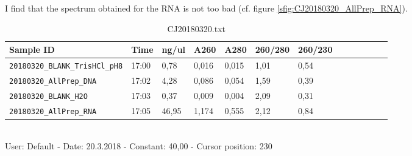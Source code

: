 I find that the spectrum obtained for the RNA is not too bad (cf. figure \ref{sfig:CJ20180320_AllPrep_RNA}).

\begin{table}[H]
\caption{CJ20180320.txt}
\label{tab:}
\centering
\begin{tabular}{l l l l l l l l l l l l l }
\toprule
Sample ID & Time  & ng/ul  & A260  & A280  & 260/280  & 260/230  \\ \midrule
\texttt{20180320\_BLANK\_TrisHCl\_pH8} & 17:00 & 0,78 & 0,016 & 0,015 & 1,01 & 0,54 \\
\texttt{20180320\_AllPrep\_DNA} & 17:02 & 4,28 & 0,086 & 0,054 & 1,59 & 0,39 \\
\texttt{20180320\_BLANK\_H2O} & 17:03 & 0,37 & 0,009 & 0,004 & 2,09 & 0,31 \\
\texttt{20180320\_AllPrep\_RNA} & 17:05 & 46,95 & 1,174 & 0,555 & 2,12 & 0,84 \\
\bottomrule
\end{tabular}
\\
User: Default - Date: 20.3.2018 - Constant: 40,00 - Cursor position: 230 \
\end{table}